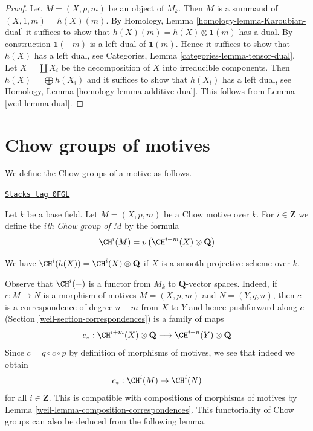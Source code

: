 \begin{proof}

Let $M = (X, p, m)$ be an object of $M_k$. Then $M$ is a summand of
$(X, 1, m) = h(X)(m)$.
By Homology, Lemma \ref{homology-lemma-Karoubian-dual}
it suffices to show that
$h(X)(m) = h(X) \otimes \mathbf{1}(m)$ has a dual.
By construction $\mathbf{1}(-m)$ is a left dual of $\mathbf{1}(m)$.
Hence it suffices to show that $h(X)$ has a left dual, see
Categories, Lemma \ref{categories-lemma-tensor-dual}.
Let $X = \coprod X_i$ be the decomposition of $X$ into
irreducible components. Then $h(X) = \bigoplus h(X_i)$
and it suffices to show that $h(X_i)$ has a left dual, see
Homology, Lemma \ref{homology-lemma-additive-dual}.
This follows from Lemma \ref{weil-lemma-dual}.
\end{proof}

\section{Chow groups of motives}
\label{weil-section-chow-groups-motives}
We define the Chow groups of a motive as follows.

\begin{definition}
\label{weil-definition-chow-group-motives}
\href{https://stacks.math.columbia.edu/tag/0FGL}{\texttt{Stacks tag 0FGL}}

Let $k$ be a base field. Let $M = (X, p, m)$ be a Chow motive over $k$.
For $i \in \mathbf{Z}$ we define the {\it $i$th Chow group of $M$}
by the formula
$$
\CH^i(M) = p\left(\CH^{i + m}(X) \otimes \mathbf{Q}\right)
$$
\end{definition}

We have $\CH^i(h(X)) = \CH^i(X) \otimes \mathbf{Q}$
if $X$ is a smooth projective scheme over $k$.

\medskip\noindent
Observe that $\CH^i(-)$ is a functor from $M_k$ to $\mathbf{Q}$-vector spaces.
Indeed, if $c : M \to N$ is a morphism of motives
$M = (X, p, m)$ and $N = (Y, q, n)$, then $c$ is a correspondence of
degree $n - m$ from $X$ to $Y$ and hence pushforward along $c$
(Section \ref{weil-section-correspondences}) is a family of maps
$$
c_* :
\CH^{i + m}(X) \otimes \mathbf{Q}
\longrightarrow
\CH^{i + n}(Y) \otimes \mathbf{Q}
$$
Since $c = q \circ c \circ p$ by definition of morphisms of motives,
we see that indeed we obtain
$$
c_* : \CH^i(M) \to \CH^i(N)
$$
for all $i \in \mathbf{Z}$. This is compatible with compositions of
morphisms of motives by Lemma \ref{weil-lemma-composition-correspondences}.
This functoriality of Chow groups can also be deduced from the following
lemma.

